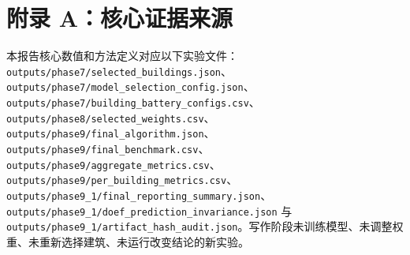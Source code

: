 \documentclass[12pt,a4paper]{article}
\begin{document}
\section{附录 A：核心证据来源}
本报告核心数值和方法定义对应以下实验文件：\nolinkurl{outputs/phase7/selected_buildings.json}、\nolinkurl{outputs/phase7/model_selection_config.json}、\nolinkurl{outputs/phase7/building_battery_configs.csv}、\nolinkurl{outputs/phase8/selected_weights.csv}、\nolinkurl{outputs/phase9/final_algorithm.json}、\nolinkurl{outputs/phase9/final_benchmark.csv}、\nolinkurl{outputs/phase9/aggregate_metrics.csv}、\nolinkurl{outputs/phase9/per_building_metrics.csv}、\nolinkurl{outputs/phase9_1/final_reporting_summary.json}、\nolinkurl{outputs/phase9_1/doef_prediction_invariance.json} 与 \nolinkurl{outputs/phase9_1/artifact_hash_audit.json}。写作阶段未训练模型、未调整权重、未重新选择建筑、未运行改变结论的新实验。\par
\end{document}
